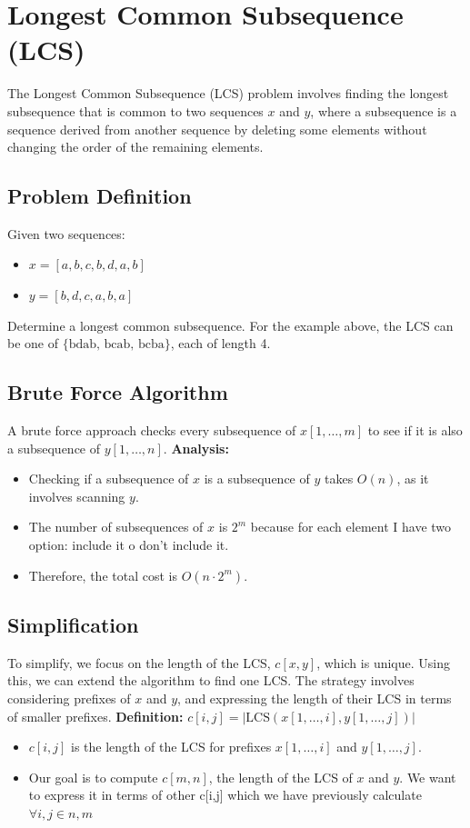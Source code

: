 \section{Longest Common Subsequence (LCS)}

The Longest Common Subsequence (LCS) problem involves finding the longest subsequence that is common to two sequences \(x\) and \(y\), where a subsequence is a sequence derived from another sequence by deleting some elements without changing the order of the remaining elements.

\subsection{Problem Definition}
Given two sequences:
\begin{itemize}
    \item \(x = [a, b, c, b, d, a, b]\)
    \item \(y = [b, d, c, a, b, a]\)
\end{itemize}
Determine a longest common subsequence. For the example above, the LCS can be one of \(\{\text{bdab, bcab, bcba}\}\), each of length 4.

\subsection{Brute Force Algorithm}
A brute force approach checks every subsequence of \(x[1, \dots, m]\) to see if it is also a subsequence of \(y[1, \dots, n]\). \newline
\textbf{Analysis:}
\begin{itemize}
    \item Checking if a subsequence of \(x\) is a subsequence of \(y\) takes \(O(n)\), as it involves scanning \(y\).
    \item The number of subsequences of \(x\) is \(2^m\) because for each element I have two option: include it o don't include it.
    \item Therefore, the total cost is \(O(n \cdot 2^m)\).
\end{itemize}

\subsection{Simplification}
To simplify, we focus on the length of the LCS, \(c[x, y]\), which is unique. Using this, we can extend the algorithm to find one LCS. The strategy involves considering prefixes of \(x\) and \(y\), and expressing the length of their LCS in terms of smaller prefixes. \newline
\textbf{Definition:} \(c[i, j] = |\text{LCS}(x[1, \dots, i], y[1, \dots, j])|\)
\begin{itemize}
    \item \(c[i, j]\) is the length of the LCS for prefixes \(x[1, \dots, i]\) and \(y[1, \dots, j]\).
    \item Our goal is to compute \(c[m, n]\), the length of the LCS of \(x\) and \(y\). We want to express it in terms of other c[i,j] which we have previously calculate  $\forall i,j\in n,m$
\end{itemize}

